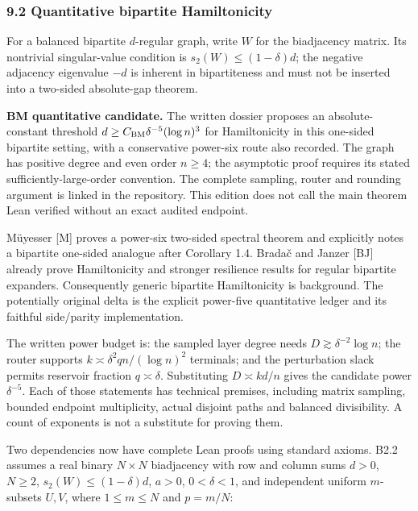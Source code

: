 \documentclass[
  11pt,
]{article}
\begin{document}
\subsubsection{9.2 Quantitative bipartite
Hamiltonicity}\label{quantitative-bipartite-hamiltonicity}

For a balanced bipartite \(d\)-regular graph, write \(W\) for the
biadjacency matrix. Its nontrivial singular-value condition is
\(s_2(W)\leq(1-\delta)d\); the negative adjacency eigenvalue \(-d\) is
inherent in bipartiteness and must not be inserted into a two-sided
absolute-gap theorem.

\textbf{BM quantitative candidate.} The written dossier proposes an
absolute-constant threshold \(d\geq C_{\rm BM}\delta^{-5}(\log n)^3\)
for Hamiltonicity in this one-sided bipartite setting, with a
conservative power-six route also recorded. The graph has positive
degree and even order \(n\geq4\); the asymptotic proof requires its
stated sufficiently-large-order convention. The complete sampling,
router and rounding argument is linked in the repository. This edition
does not call the main theorem Lean verified without an exact audited
endpoint.

Müyesser {[}M{]} proves a power-six two-sided spectral theorem and
explicitly notes a bipartite one-sided analogue after Corollary 1.4.
Bradač and Janzer {[}BJ{]} already prove Hamiltonicity and stronger
resilience results for regular bipartite expanders. Consequently generic
bipartite Hamiltonicity is background. The potentially original delta is
the explicit power-five quantitative ledger and its faithful side/parity
implementation.

The written power budget is: the sampled layer degree needs
\(D\gtrsim\delta^{-2}\log n\); the router supports
\(k\asymp\delta^2 qn/(\log n)^2\) terminals; and the perturbation slack
permits reservoir fraction \(q\asymp\delta\). Substituting
\(D\asymp kd/n\) gives the candidate power \(\delta^{-5}\). Each of
those statements has technical premises, including matrix sampling,
bounded endpoint multiplicity, actual disjoint paths and balanced
divisibility. A count of exponents is not a substitute for proving them.

Two dependencies now have complete Lean proofs using standard axioms.
B2.2 assumes a real binary \(N\times N\) biadjacency with row and column
sums \(d>0\), \(N\ge2\), \(s_2(W)\le(1-\delta)d\), \(a>0\),
\(0<\delta<1\), and independent uniform \(m\)-subsets \(U,V\), where
\(1\le m\le N\) and \(p=m/N\):
\end{document}
